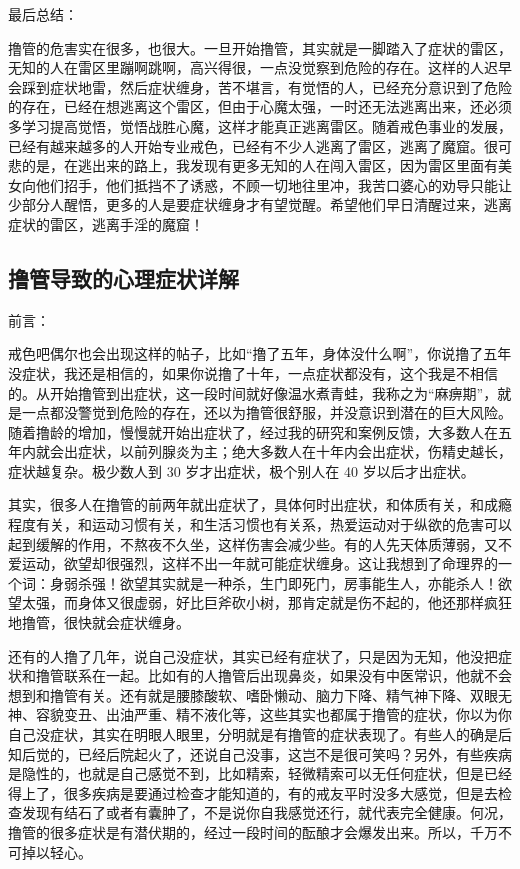 \documentclass{ctexart}
\begin{document}
最后总结：

撸管的危害实在很多，也很大。一旦开始撸管，其实就是一脚踏入了症状的雷区，无知的人在雷区里蹦啊跳啊，高兴得很，一点没觉察到危险的存在。这样的人迟早会踩到症状地雷，然后症状缠身，苦不堪言，有觉悟的人，已经充分意识到了危险的存在，已经在想逃离这个雷区，但由于心魔太强，一时还无法逃离出来，还必须多学习提高觉悟，觉悟战胜心魔，这样才能真正逃离雷区。随着戒色事业的发展，已经有越来越多的人开始专业戒色，已经有不少人逃离了雷区，逃离了魔窟。很可悲的是，在逃出来的路上，我发现有更多无知的人在闯入雷区，因为雷区里面有美女向他们招手，他们抵挡不了诱惑，不顾一切地往里冲，我苦口婆心的劝导只能让少部分人醒悟，更多的人是要症状缠身才有望觉醒。希望他们早日清醒过来，逃离症状的雷区，逃离手淫的魔窟！

\subsection{撸管导致的心理症状详解}

前言：

戒色吧偶尔也会出现这样的帖子，比如“撸了五年，身体没什么啊”，你说撸了五年没症状，我还是相信的，如果你说撸了十年，一点症状都没有，这个我是不相信的。从开始撸管到出症状，这一段时间就好像温水煮青蛙，我称之为“麻痹期”，就是一点都没警觉到危险的存在，还以为撸管很舒服，并没意识到潜在的巨大风险。随着撸龄的增加，慢慢就开始出症状了，经过我的研究和案例反馈，大多数人在五年内就会出症状，以前列腺炎为主；绝大多数人在十年内会出症状，伤精史越长，症状越复杂。极少数人到 30 岁才出症状，极个别人在 40 岁以后才出症状。

其实，很多人在撸管的前两年就出症状了，具体何时出症状，和体质有关，和成瘾程度有关，和运动习惯有关，和生活习惯也有关系，热爱运动对于纵欲的危害可以起到缓解的作用，不熬夜不久坐，这样伤害会减少些。有的人先天体质薄弱，又不爱运动，欲望却很强烈，这样不出一年就可能症状缠身。这让我想到了命理界的一个词：身弱杀强！欲望其实就是一种杀，生门即死门，房事能生人，亦能杀人！欲望太强，而身体又很虚弱，好比巨斧砍小树，那肯定就是伤不起的，他还那样疯狂地撸管，很快就会症状缠身。

还有的人撸了几年，说自己没症状，其实已经有症状了，只是因为无知，他没把症状和撸管联系在一起。比如有的人撸管后出现鼻炎，如果没有中医常识，他就不会想到和撸管有关。还有就是腰膝酸软、嗜卧懒动、脑力下降、精气神下降、双眼无神、容貌变丑、出油严重、精不液化等，这些其实也都属于撸管的症状，你以为你自己没症状，其实在明眼人眼里，分明就是有撸管的症状表现了。有些人的确是后知后觉的，已经后院起火了，还说自己没事，这岂不是很可笑吗？另外，有些疾病是隐性的，也就是自己感觉不到，比如精索，轻微精索可以无任何症状，但是已经得上了，很多疾病是要通过检查才能知道的，有的戒友平时没多大感觉，但是去检查发现有结石了或者有囊肿了，不是说你自我感觉还行，就代表完全健康。何况，撸管的很多症状是有潜伏期的，经过一段时间的酝酿才会爆发出来。所以，千万不可掉以轻心。
\end{document}
